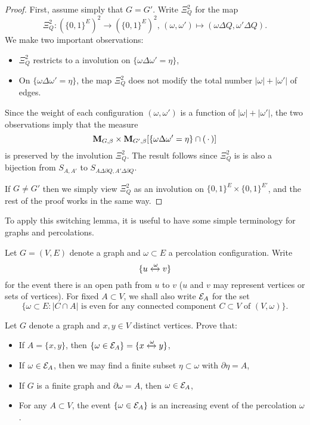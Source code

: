 \begin{proof}
    First, assume simply that $G=G'$.
    Write $\Xi_Q^2$ for the map
    \[
        \Xi_Q^2:
        (\{0,1\}^E)^2
        \to
        (\{0,1\}^E)^2
        ,\,(\omega,\omega')\mapsto (\omega\Delta Q,\omega'\Delta Q).
    \]
    We make two important observations:
    \begin{itemize}
        \item $\Xi_Q^2$ restricts to a involution on $\{\omega\Delta\omega'=\eta\}$,
        \item On $\{\omega\Delta\omega'=\eta\}$, the map $\Xi_Q^2$ does not modify the total number $|\omega|+|\omega'|$
        of edges.
    \end{itemize} 
    Since the weight of each configuration $(\omega,\omega')$ is a function of $|\omega|+|\omega'|$,
    the two observations imply that
    the measure \[\mathbf{M}_{G,\beta}\times\mathbf{M}_{G',\beta}
        [\{\omega\Delta\omega'=\eta\}\cap (\,\cdot\,)]\] is preserved by the involution
    $\Xi_Q^2$.
    The result follows since $\Xi_Q^2$ is is also a bijection from $S_{A,A'}$
    to $S_{A\Delta\partial Q,A'\Delta\partial Q}$.

    If $G\neq G'$ then we simply view $\Xi_Q^2$
    as an involution on $\{0,1\}^E\times\{0,1\}^{E'}$,
    and the rest of the proof works in the same way.
\end{proof}

To apply this switching lemma,
it is useful to have some simple terminology for graphs and percolations.

\begin{definition}
    Let $G=(V,E)$ denote a graph and $\omega\subset E$ a percolation configuration.
    Write \[\{u\xleftrightarrow{\omega}v\}\]
    for the event there is an open path from $u$ to $v$
    ($u$ and $v$ may represent vertices or sets of vertices).
    For fixed $A\subset V$, we shall also write $\mathcal E_A$ for the set
    \[
        \{\omega\subset E:\text{$|C\cap A|$ is even for any connected component $C\subset V$ of $(V,\omega)$}\}.
    \]
\end{definition}

\begin{exercise}
    Let $G$ denote a graph and 
    $x,y\in V$  distinct vertices. Prove that:
    \begin{itemize}
        \item If $A=\{x,y\}$, then $\{\omega\in\mathcal E_A\}=\{x\xleftrightarrow{\omega}y\}$,
        \item If $\omega\in\mathcal E_A$, then we may find a finite subset $\eta\subset\omega$ with $\partial\eta=A$,
        \item If $G$ is a finite graph and $\partial\omega=A$, then $\omega\in\mathcal E_A$,
        \item For any $A\subset V$, the event $\{\omega\in\mathcal E_A\}$ is an increasing event of the percolation $\omega$.
    \end{itemize}
\end{exercise}

